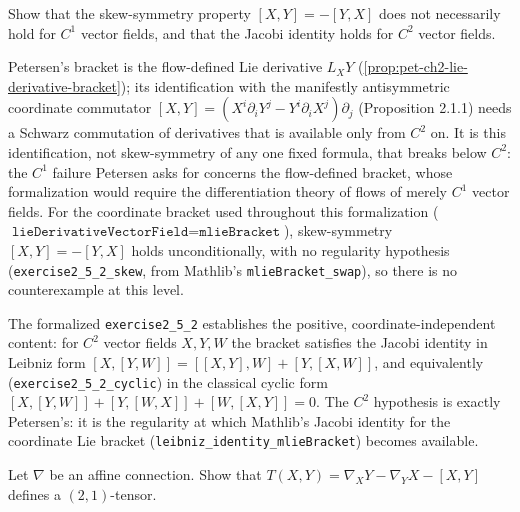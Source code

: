 \begin{remark}
  \label{rem:pet-ch2-ex-2}
  \leanok
  Show that the skew-symmetry property $[X,Y]=-[Y,X]$ does not necessarily
  hold for $C^1$ vector fields, and that the Jacobi identity holds for $C^2$
  vector fields.

  Petersen's bracket is the flow-defined Lie derivative $L_XY$
  (\cref{prop:pet-ch2-lie-derivative-bracket}); its identification with the
  manifestly antisymmetric coordinate commutator
  $[X,Y]=(X^i\partial_iY^j-Y^i\partial_iX^j)\partial_j$ (Proposition 2.1.1) needs
  a Schwarz commutation of derivatives that is available only from $C^2$ on. It is
  this identification, not skew-symmetry of any one fixed formula, that breaks
  below $C^2$: the $C^1$ failure Petersen asks for concerns the flow-defined
  bracket, whose formalization would require the differentiation theory of flows
  of merely $C^1$ vector fields. For the coordinate bracket used throughout this
  formalization ($\texttt{lieDerivativeVectorField}=\texttt{mlieBracket}$),
  skew-symmetry $[X,Y]=-[Y,X]$ holds unconditionally, with no regularity
  hypothesis (\texttt{exercise2\_5\_2\_skew}, from Mathlib's
  \texttt{mlieBracket\_swap}), so there is no counterexample at this level.

  The formalized \texttt{exercise2\_5\_2} establishes the positive,
  coordinate-independent content: for $C^2$ vector fields $X,Y,W$ the bracket
  satisfies the Jacobi identity in Leibniz form
  $[X,[Y,W]]=[[X,Y],W]+[Y,[X,W]]$, and equivalently
  (\texttt{exercise2\_5\_2\_cyclic}) in the classical cyclic form
  $[X,[Y,W]]+[Y,[W,X]]+[W,[X,Y]]=0$. The $C^2$ hypothesis is exactly Petersen's:
  it is the regularity at which Mathlib's Jacobi identity for the coordinate Lie
  bracket (\texttt{leibniz\_identity\_mlieBracket}) becomes available.
\end{remark}

\begin{remark}
  \label{rem:pet-ch2-ex-3}
  \leanok
  Let $\nabla$ be an affine connection. Show that
  $T(X,Y)=\nabla_XY-\nabla_YX-[X,Y]$ defines a $(2,1)$-tensor.
\end{remark}

